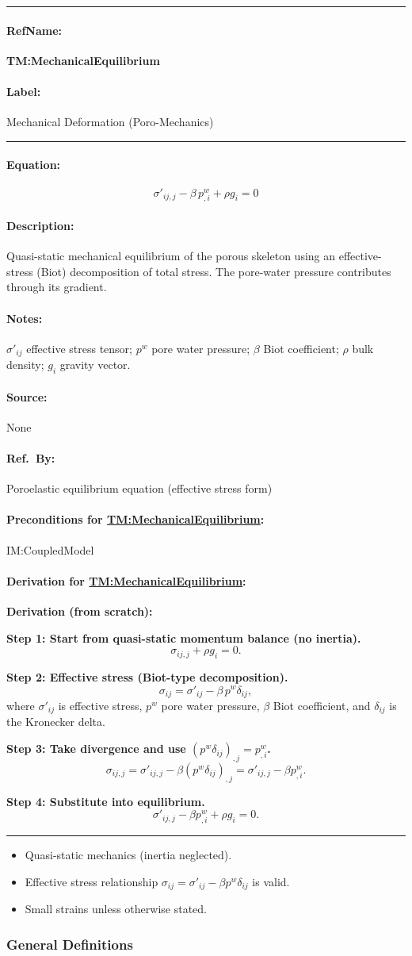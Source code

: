 \documentclass[12pt]{article}
\newcommand{\deftheory}[9][Not Applicable]
{
\newpage
\noindent \rule{\textwidth}{0.5mm}

\paragraph{RefName: } \textbf{#2} \phantomsection
\label{#2}

\paragraph{Label:} #3

\noindent \rule{\textwidth}{0.5mm}

\paragraph{Equation:}
#4

\paragraph{Description:}
#5

\paragraph{Notes:}
#6

\paragraph{Source:}
#7

\paragraph{Ref.\ By:}
#8

\paragraph{Preconditions for \hyperref[#2]{#2}:}
\label{#2_precond}
#9

\paragraph{Derivation for \hyperref[#2]{#2}:}
\label{#2_deriv}
#1

\noindent \rule{\textwidth}{0.5mm}
}
\begin{document}
\noindent
\deftheory[
\textbf{Derivation (from scratch):}

\textbf{Step 1: Start from quasi-static momentum balance (no inertia).}
\[
\sigma_{ij,j} + \rho g_i = 0.
\]

\textbf{Step 2: Effective stress (Biot-type decomposition).}
\[
\sigma_{ij} = \sigma'_{ij} - \beta\,p^{w}\delta_{ij},
\]
where $\sigma'_{ij}$ is effective stress, $p^w$ pore water pressure, $\beta$ Biot coefficient, and $\delta_{ij}$ is the Kronecker delta.

\textbf{Step 3: Take divergence and use $(p^w\delta_{ij})_{,j}=p^w_{,i}$.}
\[
\sigma_{ij,j} = \sigma'_{ij,j} - \beta (p^w\delta_{ij})_{,j}
= \sigma'_{ij,j} - \beta p^w_{,i}.
\]

\textbf{Step 4: Substitute into equilibrium.}
\[
\sigma'_{ij,j} - \beta p^w_{,i} + \rho g_i = 0.
\]
]
{TM:MechanicalEquilibrium}
{Mechanical Deformation (Poro-Mechanics)}
{
\[
\sigma'_{ij,j}-\beta\,p^{w}_{,i}+\rho g_{i}=0
\]
}
{
Quasi-static mechanical equilibrium of the porous skeleton using an effective-stress (Biot) decomposition of total stress. The pore-water pressure contributes through its gradient.
}
{
$\sigma'_{ij}$ effective stress tensor; $p^w$ pore water pressure; $\beta$ Biot coefficient; $\rho$ bulk density; $g_i$ gravity vector.
}
{None}
{Poroelastic equilibrium equation (effective stress form)}
{IM:CoupledModel}
{
\begin{itemize}
\item Quasi-static mechanics (inertia neglected).
\item Effective stress relationship $\sigma_{ij}=\sigma'_{ij}-\beta p^w\delta_{ij}$ is valid.
\item Small strains unless otherwise stated.
\end{itemize}
}
{}


\subsubsection{General Definitions}\label{sec_gendef}
\end{document}
